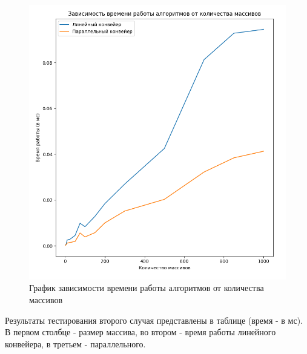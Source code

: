 \FloatBarrier
\begin{figure}[h]
	\begin{center}
		\includegraphics[width=\linewidth]{inc/number.png}
	\end{center}
	\caption{График зависимости времени работы алгоритмов от количества массивов}
\end{figure}
\FloatBarrier


Результаты тестирования второго случая представлены в таблице (время - в мс).
В первом столбце - размер массива, во втором - время работы линейного конвейера, в третьем - параллельного.

